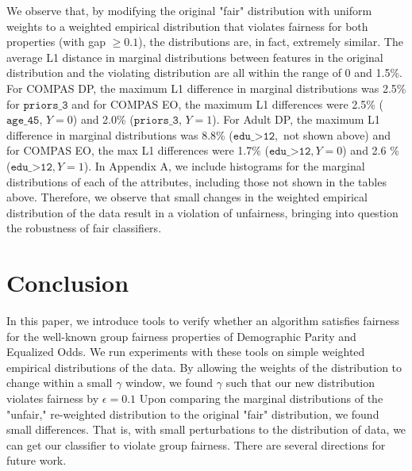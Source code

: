 \documentclass[11pt]{article}
\begin{document}
We observe that, by modifying the original "fair" distribution with uniform weights to a weighted empirical distribution that violates fairness for both properties (with gap $\ge 0.1$), the distributions are, in fact, extremely similar. The average L1 distance in marginal distributions between features in the original distribution and the violating distribution are all within the range of 0 and 1.5\%. For COMPAS DP, the maximum L1 difference in marginal distributions was 2.5\% for $\texttt{priors\_3}$ and for COMPAS EO, the maximum L1 differences were 2.5\% ($\texttt{age\_45}$, $Y = 0$) and 2.0\% ($\texttt{priors\_3}$, $Y = 1$). For Adult DP, the maximum L1 difference in marginal distributions was 8.8\% ($\texttt{edu\_>12},$ not shown above) and for COMPAS EO, the max L1 differences were 1.7\% ($\texttt{edu\_>12}, Y = 0$) and 2.6 \% ($\texttt{edu\_>12}, Y = 1$). In Appendix A, we include histograms for the marginal distributions of each of the attributes, including those not shown in the tables above. Therefore, we observe that small changes in the weighted empirical distribution of the data result in a violation of unfairness, bringing into question the robustness of fair classifiers. 

\section{Conclusion}
In this paper, we introduce tools to verify whether an algorithm satisfies fairness for the well-known group fairness properties of Demographic Parity and Equalized Odds. We run experiments with these tools on simple weighted empirical distributions of the data. By allowing the weights of the distribution to change within a small $\gamma$ window, we found $\gamma$ such that our new distribution violates fairness by $\epsilon = 0.1$ Upon comparing the marginal distributions of the "unfair," re-weighted distribution to the original "fair" distribution, we found small differences. That is, with small perturbations to the distribution of data, we can get our classifier to violate group fairness. There are several directions for future work.
\end{document}
